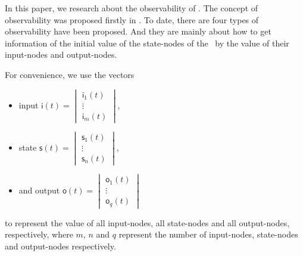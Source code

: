 
In this paper, we research about the observability of \BCNs. The concept of observability was proposed firstly in \cite{cheng2009controllability}. To date, there are four types of observability have been proposed. And they are mainly about how to get  information of the initial value of the state-nodes of the \BCNs\ by the value of their input-nodes and output-nodes. 

For convenience, we use the vectors
\begin{itemize}
	\item input $\mathsf{i}(t)=\begin{vmatrix}\mathsf{i}_1(t)\\ \vdots \\\mathsf{i}_m(t)\end{vmatrix}$,
	\item state $\mathsf{s}(t)=\begin{vmatrix}\mathsf{s}_1(t)\\ \vdots \\\mathsf{s}_n(t)\end{vmatrix}$,
	\item and output $\mathsf{o}(t)=\begin{vmatrix}\mathsf{o}_1(t)\\ \vdots \\\mathsf{o}_q(t)\end{vmatrix}$
\end{itemize}
 to represent the value of all input-nodes, all state-nodes and all output-nodes, respectively, where $m$, $n$ and $q$ represent the number of input-nodes, state-nodes and output-nodes respectively. 
 
